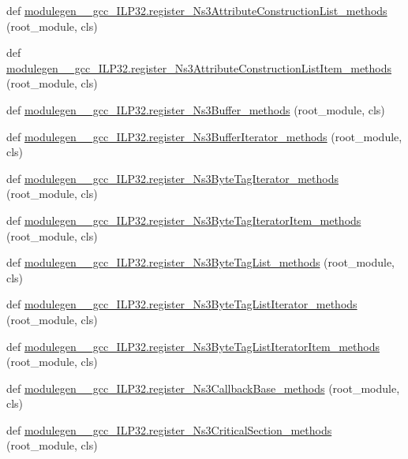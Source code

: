 \begin{DoxyCompactItemize}
def \hyperlink{namespacemodulegen____gcc__ILP32_a8e5f62edcbcf1da6ad9a86c08224bd88}{modulegen\+\_\+\+\_\+gcc\+\_\+\+I\+L\+P32.\+register\+\_\+\+Ns3\+Attribute\+Construction\+List\+\_\+methods} (root\+\_\+module, cls)
\item 
def \hyperlink{namespacemodulegen____gcc__ILP32_ace7f1f66407f5bc96929772acd5a537c}{modulegen\+\_\+\+\_\+gcc\+\_\+\+I\+L\+P32.\+register\+\_\+\+Ns3\+Attribute\+Construction\+List\+Item\+\_\+methods} (root\+\_\+module, cls)
\item 
def \hyperlink{namespacemodulegen____gcc__ILP32_a03d0a1e8a8592e4ba6f8ede106e1296e}{modulegen\+\_\+\+\_\+gcc\+\_\+\+I\+L\+P32.\+register\+\_\+\+Ns3\+Buffer\+\_\+methods} (root\+\_\+module, cls)
\item 
def \hyperlink{namespacemodulegen____gcc__ILP32_a878cdb9dc61acbc26f4e03349fb4d5ab}{modulegen\+\_\+\+\_\+gcc\+\_\+\+I\+L\+P32.\+register\+\_\+\+Ns3\+Buffer\+Iterator\+\_\+methods} (root\+\_\+module, cls)
\item 
def \hyperlink{namespacemodulegen____gcc__ILP32_ae03f3c65da14af22cebfe1ccadfd8c7d}{modulegen\+\_\+\+\_\+gcc\+\_\+\+I\+L\+P32.\+register\+\_\+\+Ns3\+Byte\+Tag\+Iterator\+\_\+methods} (root\+\_\+module, cls)
\item 
def \hyperlink{namespacemodulegen____gcc__ILP32_a3ebfdd7dfa69d398fc1a31f3343bd057}{modulegen\+\_\+\+\_\+gcc\+\_\+\+I\+L\+P32.\+register\+\_\+\+Ns3\+Byte\+Tag\+Iterator\+Item\+\_\+methods} (root\+\_\+module, cls)
\item 
def \hyperlink{namespacemodulegen____gcc__ILP32_a9d8234bc8a131df2df32c5f735b30ad9}{modulegen\+\_\+\+\_\+gcc\+\_\+\+I\+L\+P32.\+register\+\_\+\+Ns3\+Byte\+Tag\+List\+\_\+methods} (root\+\_\+module, cls)
\item 
def \hyperlink{namespacemodulegen____gcc__ILP32_ae0126e4036279c9c41f9ac4d00a6a681}{modulegen\+\_\+\+\_\+gcc\+\_\+\+I\+L\+P32.\+register\+\_\+\+Ns3\+Byte\+Tag\+List\+Iterator\+\_\+methods} (root\+\_\+module, cls)
\item 
def \hyperlink{namespacemodulegen____gcc__ILP32_a14b17aa2d90542379fe16aec66129b68}{modulegen\+\_\+\+\_\+gcc\+\_\+\+I\+L\+P32.\+register\+\_\+\+Ns3\+Byte\+Tag\+List\+Iterator\+Item\+\_\+methods} (root\+\_\+module, cls)
\item 
def \hyperlink{namespacemodulegen____gcc__ILP32_a0eba0aa92f0bdc57a46a1520487f32d1}{modulegen\+\_\+\+\_\+gcc\+\_\+\+I\+L\+P32.\+register\+\_\+\+Ns3\+Callback\+Base\+\_\+methods} (root\+\_\+module, cls)
\item 
def \hyperlink{namespacemodulegen____gcc__ILP32_a0b1d1ceece6c5f036c00d07e2fbb4e56}{modulegen\+\_\+\+\_\+gcc\+\_\+\+I\+L\+P32.\+register\+\_\+\+Ns3\+Critical\+Section\+\_\+methods} (root\+\_\+module, cls)

\end{DoxyCompactItemize}
